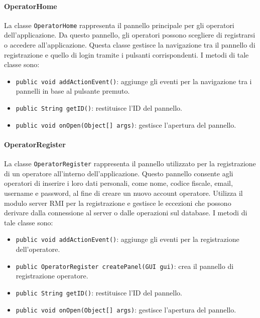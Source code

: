 \paragraph{OperatorHome}
La classe \texttt{OperatorHome} rappresenta il pannello principale per gli operatori dell'applicazione.
Da questo pannello, gli operatori possono scegliere di registrarsi o accedere all'applicazione. 
Questa classe gestisce la navigazione tra il pannello di registrazione e quello di login tramite i pulsanti corrispondenti.
I metodi di tale classe sono:
\begin{itemize}
    \item \texttt{public void addActionEvent()}: aggiunge gli eventi per la navigazione tra i pannelli in base al pulsante premuto.
    \item \texttt{public String getID()}: restituisce l'ID del pannello.
    \item \texttt{public void onOpen(Object[] args)}: gestisce l'apertura del pannello.
\end{itemize}

\paragraph{OperatorRegister}
La classe \texttt{OperatorRegister} rappresenta il pannello utilizzato per la registrazione di un operatore all'interno dell'applicazione.
Questo pannello consente agli operatori di inserire i loro dati personali, come nome, codice fiscale, email, username e password, al fine di creare un nuovo account operatore.
Utilizza il modulo server RMI per la registrazione e gestisce le eccezioni che possono derivare dalla connessione al server o dalle operazioni sul database.
I metodi di tale classe sono:
\begin{itemize}
    \item \texttt{public void addActionEvent()}: aggiunge gli eventi per la registrazione dell'operatore.
    \item \texttt{public OperatorRegister createPanel(GUI gui)}: crea il pannello di registrazione operatore.
    \item \texttt{public String getID()}: restituisce l'ID del pannello.
    \item \texttt{public void onOpen(Object[] args)}: gestisce l'apertura del pannello.
\end{itemize}

